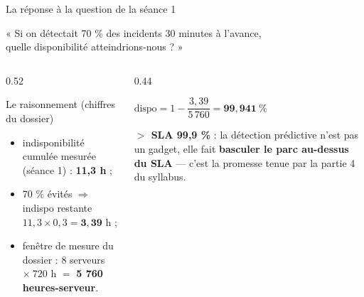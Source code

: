 \begin{frame}{La réponse à la question de la séance 1}
\begin{qbox}
\begin{center}\normalsize
« Si on détectait 70 \% des incidents 30 minutes à l'avance,\\
quelle disponibilité atteindrions-nous ? »
\end{center}
\end{qbox}
\vspace{1mm}
\begin{columns}[t]
\begin{column}{0.52\textwidth}
\begin{block}{Le raisonnement (chiffres du dossier)}
\begin{itemize}
\item indisponibilité cumulée mesurée (séance 1) : \textbf{11,3 h} ;
\item 70 \% évités $\Rightarrow$ indispo restante
$11{,}3 \times 0{,}3 = \mathbf{3{,}39}$ h ;
\item fenêtre de mesure du dossier : $8$ serveurs $\times\ 720$ h
$=$ \textbf{5 760 heures-serveur}.
\end{itemize}
\end{block}
\end{column}
\begin{column}{0.44\textwidth}
\begin{solbox}
\begin{center}
$\text{dispo} = 1 - \dfrac{3{,}39}{5\,760} = \mathbf{99{,}941\ \%}$
\end{center}
\vspace{1mm}
\textbf{$>$ SLA 99,9 \%} : la détection prédictive n'est pas un
gadget, elle fait \textbf{basculer le parc au-dessus du SLA} --- c'est
la promesse tenue par la partie 4 du syllabus.
\end{solbox}
\end{column}
\end{columns}
\end{frame}

